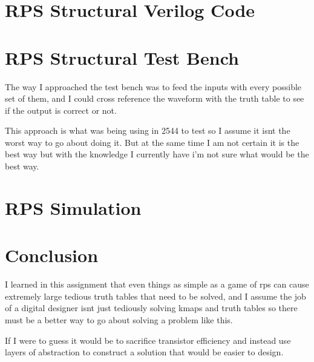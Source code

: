 \documentclass{article}
\begin{document}
\section{RPS Structural Verilog Code}
\begin{center}
\end{center}
\section{RPS Structural Test Bench}
\begin{center}
\end{center}

The way I approached the test bench was to feed the inputs with every possible set of them, and I could cross reference the waveform with the truth table to see if the output is correct or not.

This approach is what was being using in 2544 to test so I assume it isnt the worst way to go about doing it. But at the same time I am not certain it is the best way but with the knowledge I currently have i'm not sure what would be the best way.

\section{RPS Simulation}

\begin{center}
\end{center}

\section{Conclusion}

I learned in this assignment that even things as simple as a game of rps can cause extremely large tedious truth tables that need to be solved, and I assume the job of a digital designer isnt just tediously solving kmaps and truth tables so there must be a better way to go about solving a problem like this.

If I were to guess it would be to sacrifice transistor efficiency and instead use layers of abstraction to construct a solution that would be easier to design.
\end{document}
